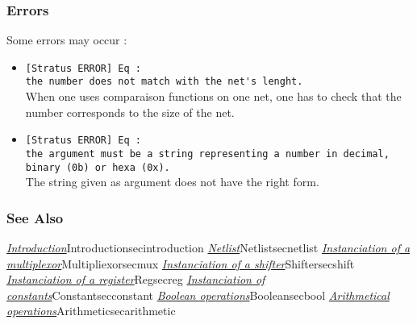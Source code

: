 \subsubsection{Errors}
    
Some errors may occur :
\begin{itemize}
    \item \verb-[Stratus ERROR] Eq :-\\\verb-the number does not match with the net's lenght.-\\When one uses comparaison functions on one net, one has to check that the number corresponds to the size of the net.
    \item \verb-[Stratus ERROR] Eq :-\\\verb-the argument must be a string representing a number in decimal,-\\\verb-binary (0b) or hexa (0x).-\\The string given as argument does not have the right form.
\end{itemize}

\begin{htmlonly}

\subsubsection{See Also}

\hyperref[ref]{\emph{Introduction}}{}{Introduction}{secintroduction}
\hyperref[ref]{\emph{Netlist}}{}{Netlist}{secnetlist}
\hyperref[ref]{\emph{Instanciation of a multiplexor}}{}{Multipliexor}{secmux}
\hyperref[ref]{\emph{Instanciation of a shifter}}{Shifter}{}{secshift}
\hyperref[ref]{\emph{Instanciation of a register}}{}{Reg}{secreg}
\hyperref[ref]{\emph{Instanciation of constants}}{Constant}{}{secconstant}
\hyperref[ref]{\emph{Boolean operations}}{}{Boolean}{secbool}
\hyperref[ref]{\emph{Arithmetical operations}}{}{Arithmetic}{secarithmetic}

\end{htmlonly}
